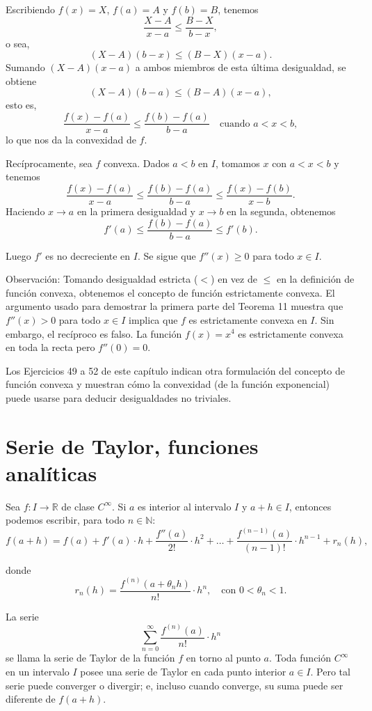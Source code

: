 \documentclass[12pt,oneside]{book}
\begin{document}
Escribiendo \( f(x) = X \), \( f(a) = A \) y \( f(b) = B \), tenemos
\[
\frac{X - A}{x - a} \leq \frac{B - X}{b - x},
\]
o sea,
\[
(X - A)(b - x) \leq (B - X)(x - a).
\]
Sumando \( (X - A)(x - a) \) a ambos miembros de esta última desigualdad, se obtiene
\[
(X - A)(b - a) \leq (B - A)(x - a),
\]
esto es,
\[
\frac{f(x) - f(a)}{x - a} \leq \frac{f(b) - f(a)}{b - a} \quad \text{cuando } a < x < b,
\]
lo que nos da la convexidad de \( f \).

Recíprocamente, sea \( f \) convexa. Dados \( a < b \) en \( I \), tomamos \( x \) con \( a < x < b \) y tenemos
\[
\frac{f(x) - f(a)}{x - a} \leq \frac{f(b) - f(a)}{b - a} \leq \frac{f(x) - f(b)}{x - b}.
\]
Haciendo \( x \to a \) en la primera desigualdad y \( x \to b \) en la segunda, obtenemos
\[
f'(a) \leq \frac{f(b) - f(a)}{b - a} \leq f'(b).
\]

Luego \( f' \) es no decreciente en \( I \). Se sigue que \( f''(x) \geq 0 \) para todo \( x \in I \).

Observación: Tomando desigualdad estricta (\( < \)) en vez de \( \leq \) en la definición de función convexa, obtenemos el concepto de función estrictamente convexa. El argumento usado para demostrar la primera parte del Teorema 11 muestra que \( f''(x) > 0 \) para todo \( x \in I \) implica que \( f \) es estrictamente convexa en \( I \). Sin embargo, el recíproco es falso. La función \( f(x) = x^4 \) es estrictamente convexa en toda la recta pero \( f''(0) = 0 \).

Los Ejercicios 49 a 52 de este capítulo indican otra formulación del concepto de función convexa y muestran cómo la convexidad (de la función exponencial) puede usarse para deducir desigualdades no triviales.

\section{Serie de Taylor, funciones analíticas}

Sea \( f: I \to \mathbb{R} \) de clase \( C^\infty \). Si \( a \) es interior al intervalo \( I \) y \( a + h \in I \), entonces podemos escribir, para todo \( n \in \mathbb{N} \):
\[
f(a+h) = f(a) + f'(a) \cdot h + \frac{f''(a)}{2!} \cdot h^2 + \dots + \frac{f^{(n-1)}(a)}{(n-1)!} \cdot h^{n-1} + r_n(h),
\]

donde
\[
r_n(h) = \frac{f^{(n)}(a + \theta_n h)}{n!} \cdot h^n, \quad \text{con } 0 < \theta_n < 1.
\]

La serie
\[
\sum_{n=0}^{\infty} \frac{f^{(n)}(a)}{n!} \cdot h^n
\]
se llama la serie de Taylor de la función \( f \) en torno al punto \( a \). Toda función \( C^\infty \) en un intervalo \( I \) posee una serie de Taylor en cada punto interior \( a \in I \). Pero tal serie puede converger o divergir; e, incluso cuando converge, su suma puede ser diferente de \( f(a + h) \).
\end{document}
